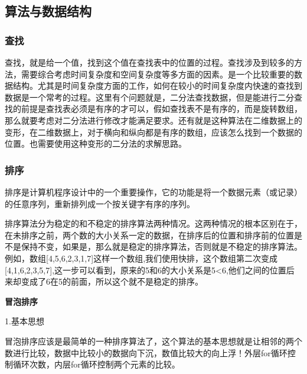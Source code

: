 \documentclass[UTF8]{ctexart}
\begin{document}
\subsection{算法与数据结构}
\subsubsection{查找}
查找，就是给一个值，找到这个值在查找表中的位置的过程。查找涉及到较多的方法，需要综合考虑时间复杂度和空间复杂度等多方面的因素。是一个比较重要的数据结构。尤其是时间复杂度方面的工作，如何在较小的时间复杂度内快速的查找到数据是一个常考的过程。这里有个问题就是，二分法查找数据，但是能进行二分查找的前提是查找表必须是有序的才可以，假如查找表不是有序的，而是旋转数组，那么就要考虑对二分法进行修改才能满足要求。还有就是这种算法在二维数据上的变形，在二维数据上，对于横向和纵向都是有序的数组，应该怎么找到一个数据的位置。也需要使用这种变形的二分法的求解思路。
\subsubsection{排序}
排序是计算机程序设计中的一个重要操作，它的功能是将一个数据元素（或记录）的任意序列，重新排列成一个按关键字有序的序列。

排序算法分为稳定的和不稳定的排序算法两种情况。这两种情况的根本区别在于，在未排序之前，两个数的大小关系一定的数据，在排序后的位置和排序前的位置是不是保持不变，如果是，那么就是稳定的排序算法，否则就是不稳定的排序算法。例如，数组[4,5,6,2,3,1,7]这样一个数组,我们使用快排，这个数组第二次变成[4,1,6,2,3,5,7],这一步可以看到，原来的5和6的大小关系是5<6,他们之间的位置后来却变成了6在5的前面，所以这个就不是稳定的排序。

\textbf{冒泡排序}

1.基本思想

冒泡排序应该是最简单的一种排序算法了，这个算法的基本思想就是让相邻的两个数进行比较，数据中比较小的数据向下沉，数值比较大的向上浮！外层for循环控制循环次数，内层for循环控制两个元素的比较。
\end{document}
